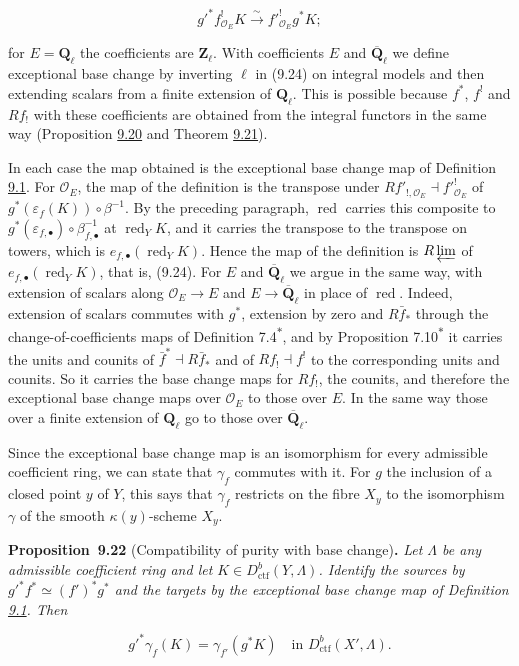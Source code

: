 \documentclass[11pt]{article}
\newenvironment{bpstatement}[2]{\par\addvspace{0.6\baselineskip}\noindent\textbf{#1}#2\textbf{.}\enspace\ignorespaces}
  {\par\addvspace{0.4\baselineskip}}
\newenvironment{bpstatementit}[2]{\begin{bpstatement}{#1}{#2}\itshape\ignorespaces}{\end{bpstatement}}
\newcommand{\bpout}[1]{#1\textsuperscript{\hyperlink{bp-outside}{\ensuremath{\ast}}}}
\begin{document}
\[
g'^{*}f_{\mathcal O_E}^{!}K
\xrightarrow{\sim}f'^{!}_{\mathcal O_E}g^{*}K;
\tag{9.24}
\]

for \(E=\mathbf Q_\ell\) the coefficients are \(\mathbf Z_\ell\). With coefficients \(E\) and \(\overline{\mathbf Q}_\ell\) we define exceptional base change by inverting \(\ell\) in (9.24) on integral models and then extending scalars from a finite extension of \(\mathbf Q_\ell\). This is possible because \(f^*\), \(f^!\) and \(Rf_!\) with these coefficients are obtained from the integral functors in the same way (Proposition \hyperref[bp68]{9.20} and Theorem \hyperref[bp71]{9.21}).

In each case the map obtained is the exceptional base change map of Definition \hyperref[bp7]{9.1}. For \(\mathcal O_E\), the map of the definition is the transpose under \(Rf'_{!,\mathcal O_E}\dashv f'^!_{\mathcal O_E}\) of \(g^*(\varepsilon_f(K))\circ\beta^{-1}\). By the preceding paragraph, \(\operatorname{red}\) carries this composite to \(g^*(\varepsilon_{f,\bullet})\circ\beta_{f,\bullet}^{-1}\) at \(\operatorname{red}_YK\), and it carries the transpose to the transpose on towers, which is \(e_{f,\bullet}(\operatorname{red}_YK)\). Hence the map of the definition is \(R\varprojlim\) of \(e_{f,\bullet}(\operatorname{red}_YK)\), that is, (9.24). For \(E\) and \(\overline{\mathbf Q}_\ell\) we argue in the same way, with extension of scalars along \(\mathcal O_E\to E\) and \(E\to\overline{\mathbf Q}_\ell\) in place of \(\operatorname{red}\). Indeed, extension of scalars commutes with \(g^*\), extension by zero and \(R\bar f_*\) through the change-of-coefficients maps of Definition \bpout{7.4}, and by Proposition \bpout{7.10} it carries the units and counits of \(\bar f^*\dashv R\bar f_*\) and of \(Rf_!\dashv f^!\) to the corresponding units and counits. So it carries the base change maps for \(Rf_!\), the counits, and therefore the exceptional base change maps over \(\mathcal O_E\) to those over \(E\). In the same way those over a finite extension of \(\mathbf Q_\ell\) go to those over \(\overline{\mathbf Q}_\ell\).

Since the exceptional base change map is an isomorphism for every admissible coefficient ring, we can state that \(\gamma_f\) commutes with it. For \(g\) the inclusion of a closed point \(y\) of \(Y\), this says that \(\gamma_f\) restricts on the fibre \(X_y\) to the isomorphism \(\gamma\) of the smooth \(\kappa(y)\)-scheme \(X_y\).

\label{bp78}%
\begin{bpstatementit}{Proposition~9.22}{ (Compatibility of purity with base change)}
Let \(\Lambda\) be any admissible coefficient ring and let \(K\in D^b_{\mathrm{ctf}}(Y,\Lambda)\). Identify the sources by \(g'^{*}f^{*}\simeq(f')^{*}g^{*}\) and the targets by the exceptional base change map of Definition \hyperref[bp7]{9.1}. Then

\[
g'^{*}\gamma_f(K)
=\gamma_{f'}(g^{*}K)
\quad\text{in }D^b_{\mathrm{ctf}}(X',\Lambda).
\]
\end{bpstatementit}
\end{document}
